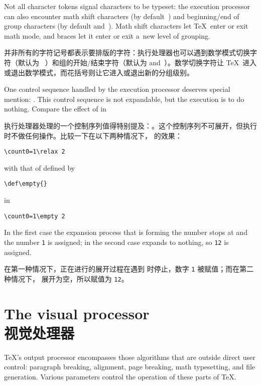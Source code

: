 Not all character tokens signal characters to be typeset:
the execution processor can also encounter math shift
\awp
characters (by default~) and beginning/end of group
characters (by default  and~).
Math shift characters let \TeX\ enter or exit
math mode, and braces let it enter or exit a~new level of
grouping.

并非所有的字符记号都表示要排版的字符：执行处理器也可以遇到数学模式切换字符（默认为 ~）和组的开始/结束字符（默认为  and~）。数学切换字符让 \TeX\ 进入或退出数学模式，而花括号则让它进入或退出新的分组级别。

One control sequence handled by the execution processor 
deserves special mention: .
This control sequence is not expandable, but the execution
is to do nothing. Compare the effect of  in

执行处理器处理的一个控制序列值得特别提及：。这个控制序列不可展开，但执行时不做任何操作。比较一下在以下两种情况下， 的效果：
\begin{verbatim}
\count0=1\relax 2
\end{verbatim}
with that of 
defined by 


\begin{verbatim}
\def\empty{}
\end{verbatim}
in 

\begin{verbatim}
\count0=1\empty 2
\end{verbatim}
In the first case the expansion
process that is forming the number stops at  and
the number {\tt 1} is assigned; in the second case 
 expands to nothing, so {\tt 12} is assigned.

在第一种情况下，正在进行的展开过程在遇到  时停止，数字 {\tt 1} 被赋值；而在第二种情况下， 展开为空，所以赋值为 {\tt 12}。



\section{The visual processor\\视觉处理器}

\TeX's output processor encompasses those algorithms that
are outside direct user control: paragraph breaking,
alignment, page breaking, math typesetting, and  file
generation. Various parameters control the operation
of these parts of \TeX.

